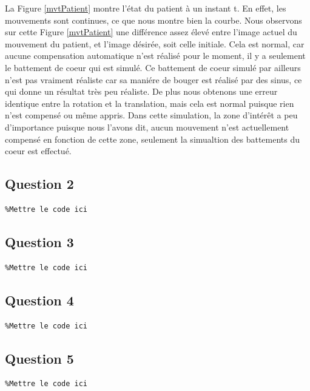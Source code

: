 \documentclass[a4paper,11pt]{article}
\begin{document}
La Figure \ref{mvtPatient} montre l'\'etat du patient \`a un instant t. En effet, les mouvements sont continues, ce que nous montre bien la courbe. Nous observons sur cette Figure \ref{mvtPatient} une diff\'erence assez \'elev\'e entre l'image actuel du mouvement du patient, et l'image d\'esir\'ee, soit celle initiale. Cela est normal, car aucune compensation automatique n'est r\'ealis\'e pour le moment, il y a seulement le battement de coeur qui est simul\'e. Ce battement de coeur simul\'e par ailleurs n'est pas vraiment r\'ealiste car sa mani\'ere de bouger est r\'ealis\'e par des sinus, ce qui donne un r\'esultat tr\`es peu r\'ealiste. De plus nous obtenons une erreur identique entre la rotation et la translation, mais cela est normal puisque rien n'est compens\'e ou m\^eme appris.
Dans cette simulation, la zone d'int\'er\^et a peu d'importance puisque nous l'avons dit, aucun mouvement n'est actuellement compens\'e en fonction de cette zone, seulement la simualtion des battements du coeur est effectu\'e.

\subsection{Question 2}
\begin{verbatim}
%Mettre le code ici
\end{verbatim}

\subsection{Question 3}
\begin{verbatim}
%Mettre le code ici
\end{verbatim}

\subsection{Question 4}
\begin{verbatim}
%Mettre le code ici
\end{verbatim}

\subsection{Question 5}
\begin{verbatim}
%Mettre le code ici
\end{verbatim}
\end{document}
